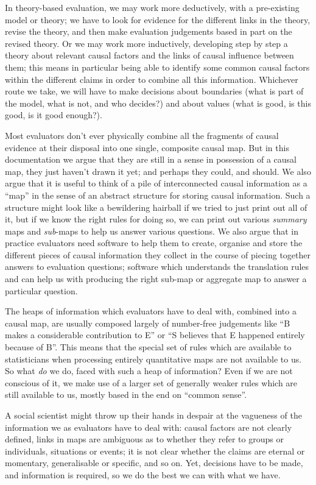 \documentclass[
]{book}
\begin{document}
In theory-based evaluation, we may work more deductively, with a pre-existing model or theory; we have to look for evidence for the different links in the theory, revise the theory, and then make evaluation judgements based in part on the revised theory. Or we may work more inductively, developing step by step a theory about relevant causal factors and the links of causal influence between them; this means in particular being able to identify some common causal factors within the different claims in order to combine all this information. Whichever route we take, we will have to make decisions about boundaries (what is part of the model, what is not, and who decides?) and about values (what is good, is this good, is it good enough?).

Most evaluators don't ever physically combine all the fragments of causal evidence at their disposal into one single, composite causal map. But in this documentation we argue that they are still in a sense in possession of a causal map, they just haven't drawn it yet; and perhaps they could, and should. We also argue that it is useful to think of a pile of interconnected causal information as a ``map'' in the sense of an abstract structure for storing causal information. Such a structure might look like a bewildering hairball if we tried to just print out all of it, but if we know the right rules for doing so, we can print out various \emph{summary} maps and \emph{sub}-maps to help us answer various questions. We also argue that in practice evaluators need software to help them to create, organise and store the different pieces of causal information they collect in the course of piecing together answers to evaluation questions; software which understands the translation rules and can help us with producing the right sub-map or aggregate map to answer a particular question.

The heaps of information which evaluators have to deal with, combined into a causal map, are usually composed largely of number-free judgements like ``B makes a considerable contribution to E'' or ``S believes that E happened entirely because of B''. This means that the special set of rules which are available to statisticians when processing entirely quantitative maps are not available to us. So what \emph{do} we do, faced with such a heap of information? Even if we are not conscious of it, we make use of a larger set of generally weaker rules which are still available to us, mostly based in the end on ``common sense''.

A social scientist might throw up their hands in despair at the vagueness of the information we as evaluators have to deal with: causal factors are not clearly defined, links in maps are ambiguous as to whether they refer to groups or individuals, situations or events; it is not clear whether the claims are eternal or momentary, generalisable or specific, and so on. Yet, decisions have to be made, and information is required, so we do the best we can with what we have.
\end{document}
